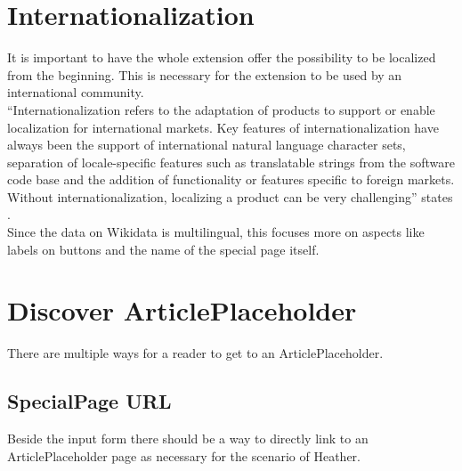 \section{Internationalization}
It is important to have the whole extension offer the possibility to be localized from the beginning. This is necessary for the extension to be used by an international community. \\ 
``Internationalization refers to the adaptation of products to support or enable localization for international markets. Key features of internationalization have always been the support of international natural language character sets, separation of locale-specific features such as translatable strings from the software code base and the addition of functionality or features specific to foreign markets. Without internationalization, localizing a product can be very challenging'' states \citet[23]{localization}. \\
Since the data on Wikidata is multilingual, this focuses more on aspects like labels on buttons and the name of the special page itself.

\section{Discover ArticlePlaceholder}

There are multiple ways for a reader to get to an ArticlePlaceholder. 

\subsection{SpecialPage URL}
Beside the input form there should be a way to directly link to an ArticlePlaceholder page as necessary for the scenario of Heather.

